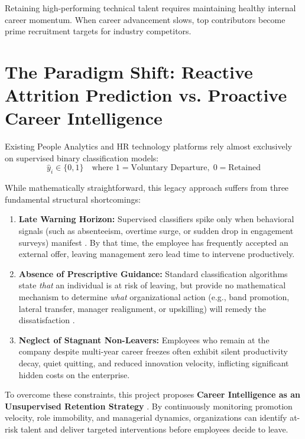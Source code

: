 \documentclass[12pt,a4paper,oneside]{report}
\begin{document}
Retaining high-performing technical talent requires maintaining healthy internal career momentum. When career advancement slows, top contributors become prime recruitment targets for industry competitors.

\section{The Paradigm Shift: Reactive Attrition Prediction vs. Proactive Career Intelligence}
Existing People Analytics and HR technology platforms rely almost exclusively on supervised binary classification models:
$$\hat{y}_i \in \{0, 1\} \quad \text{where } 1 = \text{Voluntary Departure}, \; 0 = \text{Retained}$$

While mathematically straightforward, this legacy approach suffers from three fundamental structural shortcomings:
\begin{enumerate}
  \item \textbf{Late Warning Horizon:} Supervised classifiers spike only when behavioral signals (such as absenteeism, overtime surge, or sudden drop in engagement surveys) manifest \cite{ref_griffeth_meta}. By that time, the employee has frequently accepted an external offer, leaving management zero lead time to intervene productively.
  \item \textbf{Absence of Prescriptive Guidance:} Standard classification algorithms state \textit{that} an individual is at risk of leaving, but provide no mathematical mechanism to determine \textit{what} organizational action (e.g., band promotion, lateral transfer, manager realignment, or upskilling) will remedy the dissatisfaction \cite{ref_bapna_analytics}.
  \item \textbf{Neglect of Stagnant Non-Leavers:} Employees who remain at the company despite multi-year career freezes often exhibit silent productivity decay, quiet quitting, and reduced innovation velocity, inflicting significant hidden costs on the enterprise.
\end{enumerate}

To overcome these constraints, this project proposes \textbf{Career Intelligence as an Unsupervised Retention Strategy} \cite{ref_tambe_ai_hr}. By continuously monitoring promotion velocity, role immobility, and managerial dynamics, organizations can identify at-risk talent and deliver targeted interventions before employees decide to leave.
\end{document}
